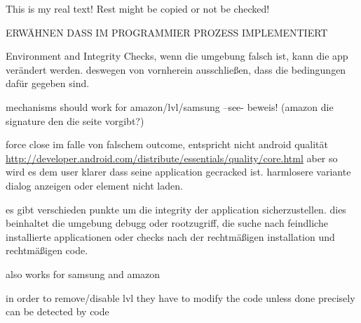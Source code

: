 This is my real text! Rest might be copied or not be checked!

ERWÄHNEN DASS IM PROGRAMMIER PROZESS  IMPLEMENTIERT\newline

Environment and Integrity Checks, wenn die umgebung falsch ist, kann die app verändert werden. deswegen von vornherein ausschließen, dass die bedingungen dafür gegeben sind.
\cite{munteanMaster}

mechanisms should work for amazon/lvl/samsung --see- beweis! (amazon die signature den die seite vorgibt?)

force close im falle von falschem outcome, entspricht nicht android qualität
\url{http://developer.android.com/distribute/essentials/quality/core.html} aber so wird es dem user klarer dass seine application gecracked ist. harmlosere variante dialog anzeigen oder element nicht laden.

es gibt verschieden punkte um die integrity der application sicherzustellen. dies beinhaltet die umgebung debugg oder rootzugriff, die suche nach feindliche installierte applicationen oder checks nach der rechtmäßigen installation und rechtmäßigen code.

also works for samsung and amazon

%
in order to remove/disable lvl they have to modify the code
unless done precisely can be detected by code
\cite{developersSecuring}
%
